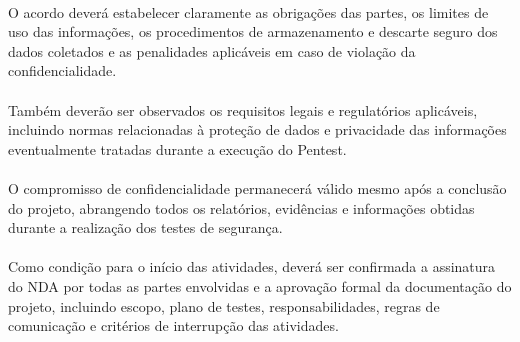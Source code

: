 \paragraph{}
O acordo deverá estabelecer claramente as obrigações das partes, os limites de
uso das informações, os procedimentos de armazenamento e descarte seguro dos
dados coletados e as penalidades aplicáveis em caso de violação da
confidencialidade.

\paragraph{}
Também deverão ser observados os requisitos legais e regulatórios aplicáveis,
incluindo normas relacionadas à proteção de dados e privacidade das informações
eventualmente tratadas durante a execução do Pentest.

\paragraph{}
O compromisso de confidencialidade permanecerá válido mesmo após a conclusão do
projeto, abrangendo todos os relatórios, evidências e informações obtidas
durante a realização dos testes de segurança.

\paragraph{}
Como condição para o início das atividades, deverá ser confirmada a assinatura
do NDA por todas as partes envolvidas e a aprovação formal da documentação do
projeto, incluindo escopo, plano de testes, responsabilidades, regras de
comunicação e critérios de interrupção das atividades.
